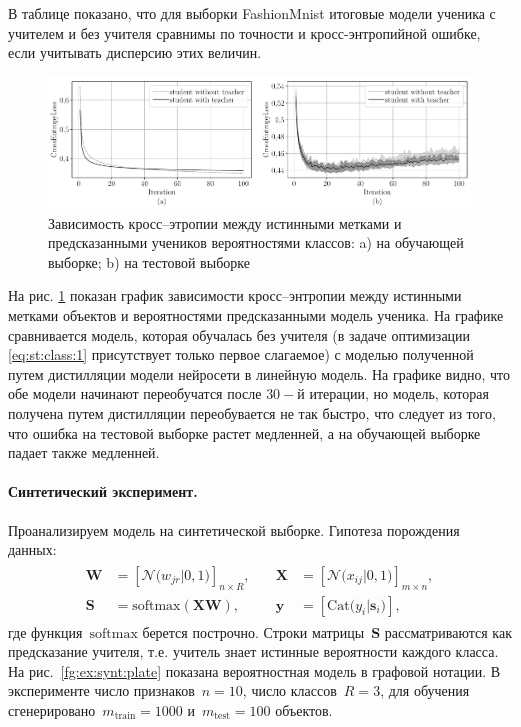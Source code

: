 В таблице показано, что для выборки FashionMnist итоговые модели ученика с учителем и без учителя сравнимы по точности и кросс-энтропийной ошибке, если учитывать дисперсию этих величин.

\begin{figure}[!ht]\center
\includegraphics[width=1\textwidth]{results/privlearn/mnist_loss}
\caption{Зависимость кросс--этропии между истинными метками и предсказанными учеников вероятностями классов: a) на обучающей выборке; b) на тестовой выборке}
\label{fg:ex:fashionmnist:loss}
\end{figure}

На рис. \ref{fg:ex:fashionmnist:loss} показан график зависимости кросс--энтропии между истинными метками объектов и вероятностями предсказанными модель ученика. На графике сравнивается модель, которая обучалась без учителя (в задаче оптимизации \eqref{eq:st:class:1} присутствует только первое слагаемое) с моделью полученной путем дистилляции модели нейросети в линейную модель. На графике видно, что обе модели начинают переобучатся после $30-$й итерации, но модель, которая получена путем дистилляции переобувается не так быстро, что следует из того, что ошибка на тестовой выборке растет медленней, а на обучающей выборке падает также медленней.


\paragraph{Синтетический эксперимент.} Проанализируем модель на синтетической выборке. Гипотеза порождения данных:
\begin{gather}
\begin{aligned}
\mathbf{W} &= \left[\mathcal{N}\bigr(w_{jr}|0, 1\bigr)\right]_{n\times R}, \quad &\mathbf{X} &= \left[\mathcal{N}\bigr(x_{ij}|0, 1\bigr)\right]_{m\times n}, \\
 \mathbf{S} &= \text{softmax}\left(\mathbf{XW}\right), \quad &\mathbf{y} &= \left[\text{Cat}\bigr(y_i| \mathbf{s}_i\bigr)\right],
\end{aligned}
\end{gather}
где функция~$\text{softmax}$ берется построчно. Строки матрицы~$\mathbf{S}$ рассматриваются как предсказание учителя, т.е. учитель знает истинные вероятности каждого класса. На рис.~\ref{fg:ex:synt:plate} показана вероятностная модель в графовой нотации. В эксперименте число признаков~$n=10$, число классов~$R=3$, для обучения сгенерировано~$m_{\text{train}}=1000$ и~$m_{\text{test}}=100$ объектов.

